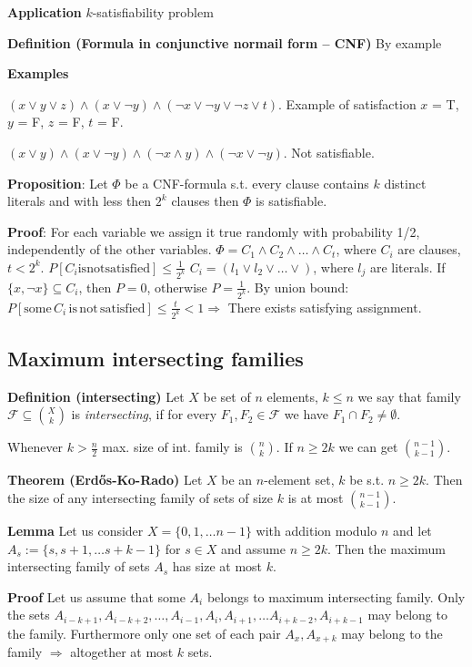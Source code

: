 \documentclass[a4paper]{article}
\begin{document}
\textbf{Application}
$k$-satisfiability problem

\textbf{Definition (Formula in conjunctive normail form -- CNF)}
By example

\textbf{Examples}

$(x \lor y \lor z) \land (x \lor \lnot y) \land (\lnot x \lor \lnot y \lor \lnot z \lor t)$.
Example of satisfaction $x$ = T, $y$ = F, $z$ = F, $t$ = F.

$(x \lor y) \land (x \lor \lnot y) \land (\lnot x \land y) \land (\lnot x \lor \lnot y)$.
Not satisfiable.

\textbf{Proposition}: Let $\Phi$ be a CNF-formula s.t. every clause contains $k$ distinct literals and with less then $2^k$ clauses then $\Phi$ is satisfiable.

\textbf{Proof}:
For each variable we assign it true randomly with probability 1/2, independently of the other variables.
$\Phi = C_1 \land C_2 \land \ldots \land C_t$, where $C_i$ are clauses, $t < 2^k$.
$P\left[C_i \mathrm{is not satisfied}\right] \leq \frac{1}{2^k}$
$C_i = (l_1 \lor l_2 \lor \ldots \lor)$, where $l_j$ are literals.
If $\{x, \lnot x\} \subseteq C_i$, then $P = 0$, otherwise $P = \frac{1}{2^k}$.
By union bound:
$P[\mathrm{some}\,C_i\,\mathrm{is\,not\,satisfied}] \leq \frac{t}{2^k} < 1 \Rightarrow$ There exists satisfying assignment.

\subsection*{Maximum intersecting families}

\textbf{Definition (intersecting)} Let $X$ be set of $n$ elements, $k \leq n$ we say that family $\mathcal{F} \subseteq {X \choose k}$ is \emph{intersecting}, if for every $F_1, F_2 \in \mathcal{F}$ we have $F_1 \cap F_2 \neq \emptyset$.

Whenever  $k > \frac{n}{2}$ max. size of int. family is ${n \choose k}$.
If $n \geq 2k$ we can get ${n-1 \choose k-1}$.

\textbf{Theorem (Erdős-Ko-Rado)} Let $X$ be an $n$-element set, $k$ be s.t. $n \geq 2k$. Then the size of any intersecting family of sets of size $k$ is at most ${n-1 \choose k-1}$.

\textbf{Lemma}
Let us consider $X = \{0, 1, \ldots n-1\}$ with addition modulo $n$ and let $A_s := \{s, s+1, \ldots s+k-1\}$ for $s \in X$ and assume $n \geq 2k$.
Then the maximum intersecting family of sets $A_s$ has size at most $k$.

\textbf{Proof}
Let us assume that some $A_i$ belongs to maximum intersecting family.
Only the sets $A_{i-k+1}, A_{i-k+2}, \ldots, A_{i-1}, A_i, A_{i+1}, \ldots A_{i+k-2}, A_{i+k-1}$ may belong to the family.
Furthermore only one set of each pair $A_{x}, A_{x+k}$ may belong to the family $\Rightarrow$ altogether at most $k$ sets.
\end{document}
